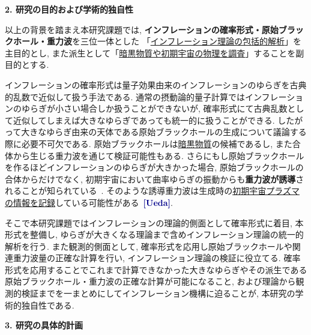 \documentclass[11pt,a4paper,uplatex,dvipdfmx]{ujarticle} 		%
\newcommand{\研究課題名}{確率解析・原始ブラックホール・重力波観測から迫るインフレーション}
\newcommand{\研究機関名}{名古屋大学}
\newcommand{\研究代表者氏名}{多田祐一郎}
\newcommand{\研究期間の最終元号年度}{6}  %
\renewcommand{\emph}[1]{{\sffamily\gtfamily\bfseries #1}}
\newcommand{\Blue}[1]{\textcolor{darkblue}{\sffamily\gtfamily\bfseries #1}}
\begin{document}
\begin{mdframed}[roundcorner=0.5zw,
	innertopmargin=0.8zw,innerbottommargin=0.8zw,
	linecolor=black!50,linewidth=0.2zw,
	backgroundcolor=black!10]
	{\bfseries\gtfamily\sffamily\large 2. 研究の目的および学術的独自性}
\end{mdframed}

\noindent
以上の背景を踏まえ本研究課題では, \emph{インフレーションの確率形式・原始ブラックホール・重力波}を三位一体とした
「\ul{インフレーション理論の包括的解析}」を主目的とし,
また派生として「\ul{暗黒物質や初期宇宙の物理を調査}」することを副目的とする.

インフレーションの確率形式は量子効果由来のインフレーションのゆらぎを古典的乱数で近似して扱う手法である.
通常の摂動論的量子計算ではインフレーションのゆらぎが小さい場合しか扱うことができないが,
確率形式にて古典乱数として近似してしまえば大きなゆらぎであっても統一的に扱うことができる.
したがって大きなゆらぎ由来の天体である原始ブラックホールの生成について議論する際に必要不可欠である.
原始ブラックホールは\ul{暗黒物質}の候補であるし, また合体から生じる重力波を通じて検証可能性もある.
さらにもし原始ブラックホールを作るほどインフレーションのゆらぎが大きかった場合,
原始ブラックホールの合体からだけでなく, 初期宇宙において曲率ゆらぎの振動からも\emph{重力波が誘導}されることが知られている~\cite{Saito:2008jc}.
そのような誘導重力波は生成時の\ul{初期宇宙プラズマの情報を記録}している可能性がある~\Blue{[Ueda]}.

そこで本研究課題ではインフレーションの理論的側面として確率形式に着目, 本形式を整備し, 
ゆらぎが大きくなる理論まで含めインフレーション理論の統一的解析を行う.
また観測的側面として, 確率形式を応用し原始ブラックホールや関連重力波量の正確な計算を行い, インフレーション理論の検証に役立てる.
確率形式を応用することでこれまで計算できなかった大きなゆらぎやその派生である原始ブラックホール・重力波の正確な計算が可能になること,
および理論から観測的検証までを一まとめにしてインフレーション機構に迫ることが, 本研究の学術的独自性である.


\begin{mdframed}[roundcorner=0.5zw,
	innertopmargin=0.8zw,innerbottommargin=0.8zw,
	linecolor=black!50,linewidth=0.2zw,
	backgroundcolor=black!10]
	{\bfseries\gtfamily\sffamily\large 3. 研究の具体的計画}
\end{mdframed}
\end{document}
